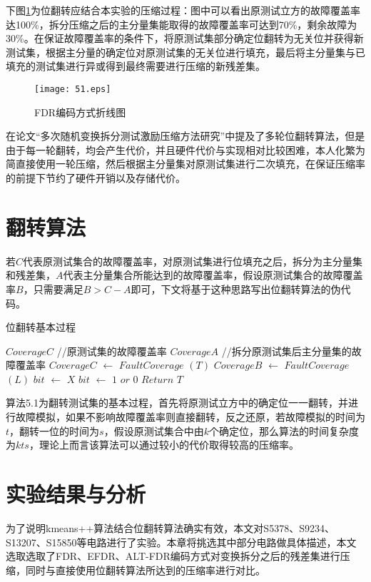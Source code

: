 下图\ref{51}为位翻转应结合本实验的压缩过程：图中可以看出原测试立方的故障覆盖率达100\%，拆分压缩之后的主分量集能取得的故障覆盖率可达到70\%，剩余故障为30\%。在保证故障覆盖率的条件下，将原测试集部分确定位翻转为无关位并获得新测试集，根据主分量的确定位对原测试集的无关位进行填充，最后将主分量集与已填充的测试集进行异或得到最终需要进行压缩的新残差集。

\begin{figure}[H]
  \centering
  \texttt{[image: 51.eps]}
  \caption{FDR编码方式折线图}\label{51}
     \end{figure}

在论文“多次随机变换拆分测试激励压缩方法研究”\cite{76}中提及了多轮位翻转算法，但是由于每一轮翻转，均会产生代价，并且硬件代价与实现相对比较困难，本人化繁为简直接使用一轮压缩，然后根据主分量集对原测试集进行二次填充，在保证压缩率的前提下节约了硬件开销以及存储代价。

\section{翻转算法}
若$C$代表原测试集合的故障覆盖率，对原测试集进行位填充之后，拆分为主分量集和残差集，$A$代表主分量集合所能达到的故障覆盖率，假设原测试集合的故障覆盖率$B$，只需要满足$B>C-A$即可，下文将基于这种思路写出位翻转算法的伪代码。

\begin{algorithm}[!h]
	\caption{位翻转基本过程}%
	\begin{algorithmic}%
        \STATE $CoverageC$  //原测试集的故障覆盖率
		\STATE $CoverageA$ $ $//拆分原测试集后主分量集的故障覆盖率
        \STATE $CoverageC$  $ \leftarrow $  $FaultCoverage$ $(T)$
        \STATE $CoverageB$  $ \leftarrow $  $FaultCoverage$ $(L)$
		\STATE $bit$  $ \leftarrow $  $X$
		\ENDIF
		\STATE $bit$  $ \leftarrow $  $1$ $or$ $0$
		\ENDIF
		\ENDFOR
        \STATE $Return$ $T$
	\end{algorithmic}
\end{algorithm}

算法5.1为翻转测试集的基本过程，首先将原测试立方中的确定位一一翻转，并进行故障模拟，如果不影响故障覆盖率则直接翻转，反之还原，若故障模拟的时间为$t$，翻转一位的时间为$s$，假设原测试集合中由$k$个确定位，那么算法的时间复杂度为$kts$，理论上而言该算法可以通过较小的代价取得较高的压缩率。

\section{实验结果与分析}
为了说明kmeans++算法结合位翻转算法确实有效，本文对S5378、S9234、S13207、S15850等电路进行了实验。本章将挑选其中部分电路做具体描述，本文选取选取了FDR、EFDR、ALT-FDR编码方式对变换拆分之后的残差集进行压缩，同时与直接使用位翻转算法所达到的压缩率进行对比。

